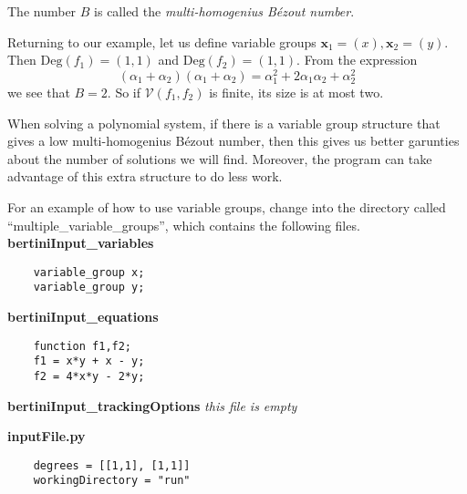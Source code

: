 \documentclass[12pt]{article}
\newcommand{\Deg}{\text{Deg}}
\begin{document}
The number $B$ is called the \emph{multi-homogenius B\'{e}zout number}.

Returning to our example, let us define variable groups $\mathbf{x}_1 = 
(x), \mathbf{x}_2 = (y)$. Then $\Deg(f_1) = (1,1)$ and $\Deg(f_2) = 
(1,1)$. From the expression
\[
    (\alpha_1 + \alpha_2)(\alpha_1 + \alpha_2) = \alpha_1^2 + 
   2\alpha_1\alpha_2 + \alpha_2^2
\]
we see that $B = 2$. So if $\mathcal{V}(f_1, f_2)$ is finite, its size is 
at most two.

When solving a polynomial system, if there is a variable group structure 
that gives a low multi-homogenius B\'{e}zout number, then this 
gives us better garunties about the number of solutions we will find. 
Moreover, the program can take advantage of this extra structure to do 
less work.

For an example of how to use variable groups, change into the directory 
called ``multiple\_variable\_groups'', which contains the following 
files.\\

\noindent \textbf{bertiniInput\_variables}
\begin{leftbar}
\vspace{-10pt} 
\begin{verbatim}
    variable_group x; 
    variable_group y; 
\end{verbatim}\vspace{-10pt} 
\end{leftbar}

\noindent \textbf{bertiniInput\_equations}
\begin{leftbar}
\vspace{-10pt} 
\begin{verbatim}
    function f1,f2;
    f1 = x*y + x - y;
    f2 = 4*x*y - 2*y;
\end{verbatim}\vspace{-10pt} 
\end{leftbar}

\noindent \textbf{bertiniInput\_trackingOptions}
\emph{this file is empty}

\noindent \textbf{inputFile.py}
\begin{leftbar}
\vspace{-10pt} 
\begin{verbatim}
    degrees = [[1,1], [1,1]]
    workingDirectory = "run"
\end{verbatim}\vspace{-10pt} 
\end{leftbar}
\end{document}
